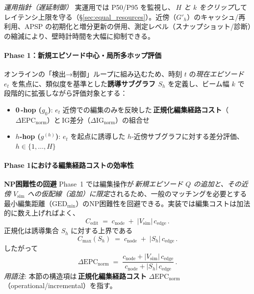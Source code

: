 \documentclass[ja=standard,xelatex]{bxjsarticle}
\newcommand{\gednorm}{\Delta\mathrm{EPC}_{\mathrm{norm}}}
\newcommand{\ignorm}{\Delta\mathrm{IG}_{\mathrm{norm}}}
\begin{document}
\noindent\textit{運用指針（遅延制御）}\; 実運用では P50/P95 を監視し、\,\emph{$H$ と $k$ をクリップ}してレイテンシ上限を守る（\S\ref{sec:equal_resources}）。近傍（$G'_h$）のキャッシュ/再利用、APSP の初期化と増分更新の併用、測定レベル（スナップショット/診断）の縮減により、壁時計時間を大幅に抑制できる。

\paragraph{Phase 1：新規エピソード中心・局所多ホップ評価}
オンラインの「検出→制御」ループに組み込むため、時刻 $t$ の\emph{現在エピソード} $e_t$ を焦点に、類似度を基準とした\textbf{誘導サブグラフ $S_h$} を定義し、ビーム幅 $k$ で段階的に拡張しながら評価対象とする：

\begin{itemize}[leftmargin=*]
  \item \textbf{0\,\mbox{-}hop ($g_0$)}: $e_t$ 近傍での編集のみを反映した\,\textbf{正規化編集経路コスト}（$\gednorm$）と\,IG差分（$\ignorm$）の組合せ
  \item \textbf{$h$-hop ($g^{(h)}$)}: $e_t$ を起点に誘導した $h$-近傍サブグラフに対する差分評価、$h\in\{1,\dots,H\}$
\end{itemize}

\paragraph{Phase 1における編集経路コストの効率性}
\textbf{NP困難性の回避}\; Phase~1 では編集操作が\,\emph{新規エピソード $Q$ の追加と、その近傍 $V_{\mathrm{sim}}$ への仮配線（追加）に限定}されるため、一般のマッチングを必要とする最小編集距離（$\mathrm{GED}_{\min}$）のNP困難性を回避できる。実装では編集コストは加法的に数え上げればよく、
\begin{equation}
  C_{\mathrm{edit}}\;=\;c_{\mathrm{node}}\; +\; |V_{\mathrm{sim}}|\,c_{\mathrm{edge}}\,.
\end{equation}
正規化は誘導集合 $S_h$ に対する上界である
\begin{equation}
  C_{\max}(S_h)\;=\;c_{\mathrm{node}}\; +\; |S_h|\,c_{\mathrm{edge}}\,.
\end{equation}
したがって
\begin{equation}
  \Delta\mathrm{EPC}_{\mathrm{norm}}\;=\;\dfrac{c_{\mathrm{node}}+|V_{\mathrm{sim}}|\,c_{\mathrm{edge}}}{c_{\mathrm{node}}+|S_h|\,c_{\mathrm{edge}}}\,.
\end{equation}
\noindent\textit{用語注}: 本節の構造項は\,\textbf{正規化編集経路コスト} $\Delta\mathrm{EPC}_{\mathrm{norm}}$（operational/incremental）を指す。
\end{document}
